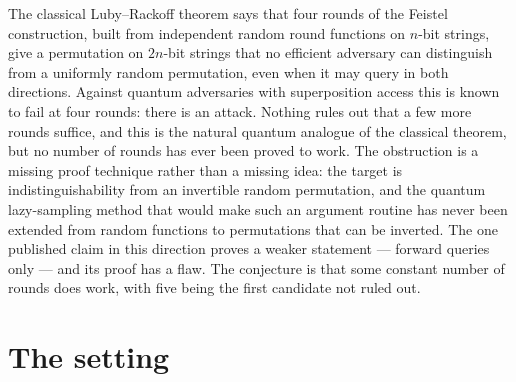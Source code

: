 \documentclass{aicr-conjecture}
\begin{document}

\vspace{0.4em}

\begin{informalconjecture}
The classical Luby--Rackoff theorem says that four rounds of the
Feistel construction, built from independent random round functions on
$n$-bit strings, give a permutation on $2n$-bit strings that no
efficient adversary can distinguish from a uniformly random
permutation, even when it may query in both directions. Against
quantum adversaries with superposition access this is known to fail at
four rounds: there is an attack. Nothing rules out that a few more
rounds suffice, and this is the natural quantum analogue of the
classical theorem, but no number of rounds has ever been proved to
work. The obstruction is a missing proof technique rather than a
missing idea: the target is indistinguishability from an invertible
random permutation, and the quantum lazy-sampling method that would
make such an argument routine has never been extended from random
functions to permutations that can be inverted. The one published
claim in this direction proves a weaker statement --- forward queries
only --- and its proof has a flaw. The conjecture is that some
constant number of rounds does work, with five being the first
candidate not ruled out.
\end{informalconjecture}

\section{The setting}\label{sec:setting}
\end{document}
